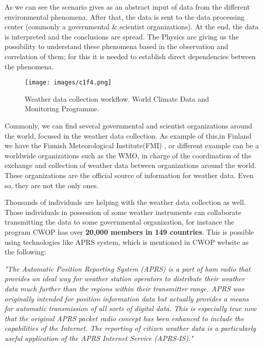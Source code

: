 As we can see the scenario gives as an abstract input of data from the different environmental phenomena. After that, the data is sent to the data processing center (commonly a governmental \& scientist organizations). At the end, the data is interpreted and the conclusions are spread. The Physics are giving us the possibility to understand these phenomena based in the observation and correlation of them; for this it is needed to establish direct dependencies between the phenomena.

\begin{figure}[H]
\centerline{\texttt{[image: images/c1f4.png]}}
\caption{Weather data collection workflow. World Climate Data and Monitoring Programme.\protect\footnotemark}
\end{figure}

Commonly, we can find several governmental and scientist organizations around the world, focused in the weather data collection. As example of this,in Finland we have the Finnish Meteorological Institute(FMI) \cite{FMI}, or different example can be a worldwide organizations such as the \gls{WMO}\cite{WMO}, in charge of the coordination of the exchange and collection of weather data between organizations around the world. These organizations are the official source of information for weather data. Even so, they are not the only ones.


Thousands of individuals are helping with the weather data collection as well. Those individuals in possession of some weather instruments can collaborate transmitting the data to some governmental organization, for instance the program \gls{CWOP} \cite{CWOP} has over \textbf{20,000 members in 149 countries}. This is possible using technologies like \gls{APRS} \cite{APRS} system, which is mentioned in CWOP website\cite{CWOP} as the following: 

\emph{"The Automatic Position Reporting System (APRS) is a part of ham radio that provides an ideal way for weather station operators to distribute their weather data much further than the regions within their transmitter range. APRS was originally intended for position information data but actually provides a means for automatic transmission of all sorts of digital data. This is especially true now that the original APRS packet radio concept has been enhanced to include the capabilities of the Internet. The reporting of citizen weather data is a particularly useful application of the APRS Internet Service (APRS-IS)."} 

